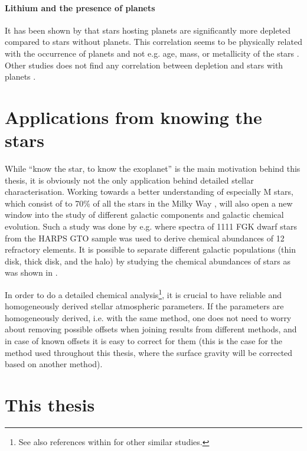 \paragraph{Lithium and the presence of planets}

It has been shown by \citet{Israelian2004,Delgado2014,Gonzalez2015,Takeda2005} that stars hosting
planets are significantly more  depleted compared to stars without planets. This
correlation seems to be physically related with the occurrence of planets and not e.g. age, mass, or
metallicity of the stars \citep{Sousa2010}. Other studies does not find any correlation between
 depletion and stars with planets \citep{Baumann2010,Ramirez2012}.



\section{Applications from knowing the stars}
\label{sec:stars_application}

While ``know the star, to know the exoplanet'' is the main motivation behind this thesis, it is
obviously not the only application behind detailed stellar characterisation. Working towards a
better understanding of especially M stars, which consist of to 70\% of all the stars in the Milky
Way \citep{Bochanski2010}, will also open a new window into the study of different galactic
components and galactic chemical evolution. Such a study was done by e.g.
\citet{Adibekyan2012,Delgado2017} where spectra of 1111 FGK dwarf stars from the HARPS GTO sample
was used to derive chemical abundances of 12 refractory elements. It is possible to separate
different galactic populations (thin disk, thick disk, and the halo) by studying the chemical
abundances of stars as was shown in \citet{Adibekyan2012}.

In order to do a detailed chemical analysis\footnote{See also references within
\citet{Adibekyan2012} for other similar studies.}, it is crucial to have reliable and homogeneously
derived stellar atmospheric parameters. If the parameters are homogeneously derived, i.e. with the
same method, one does not need to worry about removing possible offsets when joining results from
different methods, and in case of known offsets it is easy to correct for them (this is the case for
the method used throughout this thesis, where the surface gravity will be corrected based on another
method).


\section{This thesis}
\label{sec:this_thesis}

